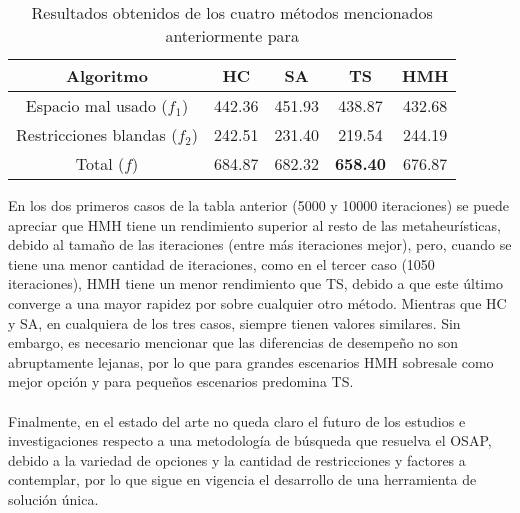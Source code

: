 \documentclass[letter, 10pt]{article}
\begin{document}
\begin{table}[H]
\begin{center}
\begin{tabular}{|c|cccc|}
    Algoritmo                    & \multicolumn{1}{c|}{HC}     & \multicolumn{1}{c|}{SA}     & \multicolumn{1}{c|}{TS}     & HMH             \\ \hline
    Espacio mal usado ($f_1$)     & \multicolumn{1}{c|}{442.36} & \multicolumn{1}{c|}{451.93} & \multicolumn{1}{c|}{438.87} & 432.68          \\ \hline
    Restricciones blandas ($f_2$) & \multicolumn{1}{c|}{242.51} & \multicolumn{1}{c|}{231.40} & \multicolumn{1}{c|}{219.54} & 244.19          \\ \hline
    Total ($f$)                    & \multicolumn{1}{c|}{684.87} & \multicolumn{1}{c|}{682.32} & \multicolumn{1}{c|}{\textbf{658.40}} & 676.87 \\ \hline
    \end{tabular}
    \caption{Resultados obtenidos de los cuatro m\'etodos mencionados anteriormente para \cite{lopes2010office}}
    \end{center}
    \label{tabla1}
\end{table}
\noindent
En los dos primeros casos de la tabla anterior (5000 y 10000 iteraciones) se puede apreciar que HMH tiene un rendimiento superior al resto de las metaheur\'isticas, debido al tama\~no de las iteraciones (entre m\'as iteraciones mejor), pero, cuando se tiene una menor cantidad de iteraciones, como en el tercer caso (1050 iteraciones), HMH tiene un menor rendimiento que TS, debido a que este \'ultimo converge a una mayor rapidez por sobre cualquier otro m\'etodo. Mientras que HC y SA, en cualquiera de los tres casos, siempre tienen valores similares. Sin embargo, es necesario mencionar que las diferencias de desempe\~no no son abruptamente lejanas, por lo que para grandes escenarios HMH sobresale como mejor opci\'on y para peque\~nos escenarios predomina TS. \\
\noindent
\\
Finalmente, en el estado del arte no queda claro el futuro de los estudios e investigaciones respecto a una metodolog\'ia de b\'usqueda que resuelva el OSAP, debido a la variedad de opciones y la cantidad de restricciones y factores a contemplar, por lo que sigue en vigencia el desarrollo de una herramienta de soluci\'on \'unica.

\end{document}
